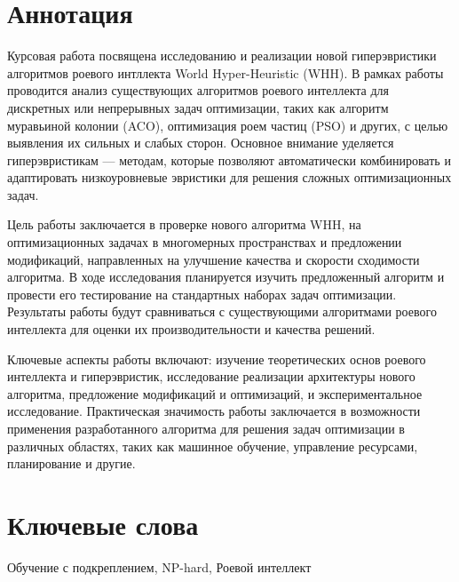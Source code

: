 \documentclass[a4paper,12pt]{extarticle}
\begin{document}
\newpage
\setcounter{page}{2}

{
	\hypersetup{linkcolor=black}
	\tableofcontents
}

\newpage

\newpage
\section*{Аннотация}   %
Курсовая работа посвящена исследованию и реализации новой гиперэвристики алгоритмов роевого интллекта World Hyper-Heuristic (WHH). В рамках работы проводится анализ существующих алгоритмов роевого интеллекта для дискретных или непрерывных задач оптимизации, таких как алгоритм муравьиной колонии (ACO), оптимизация роем частиц (PSO) и других, с целью выявления их сильных и слабых сторон. Основное внимание уделяется гиперэвристикам — методам, которые позволяют автоматически комбинировать и адаптировать низкоуровневые эвристики для решения сложных оптимизационных задач.

Цель работы заключается в проверке нового алгоритма WHH, на оптимизационных задачах в многомерных пространствах и предложении модификаций, направленных на улучшение качества и скорости сходимости алгоритма. В ходе исследования планируется изучить предложенный алгоритм и провести его тестирование на стандартных наборах задач оптимизации. Результаты работы будут сравниваться с существующими алгоритмами роевого интеллекта для оценки их производительности и качества решений.

Ключевые аспекты работы включают: изучение теоретических основ роевого интеллекта и гиперэвристик, исследование реализации архитектуры нового алгоритма, предложение модификаций и оптимизаций, и экспериментальное исследование. Практическая значимость работы заключается в возможности применения разработанного алгоритма для решения задач оптимизации в различных областях, таких как машинное обучение, управление ресурсами, планирование и другие.


\section*{Ключевые слова}
Обучение с подкреплением, NP-hard, Роевой интеллект
\pagebreak
\end{document}
